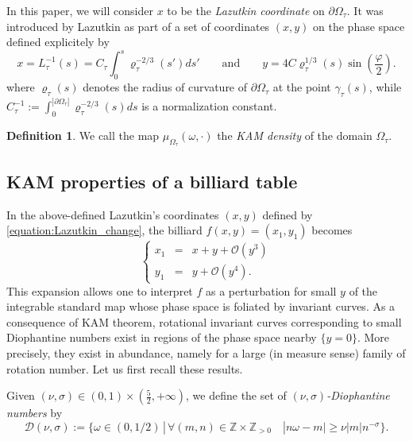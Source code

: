 \documentclass[12pt, openany]{amsart}
\theoremstyle{definition}
\newtheorem{definition}[theorem]{Definition}
\theoremstyle{remark}
\theoremstyle{remark}
\theoremstyle{theorem}
\theoremstyle{theorem}
\theoremstyle{theorem}
\theoremstyle{theorem}
\newcommand{\ZZ}{\mathbb{Z}}
\begin{document}
\medskip

In this paper, we will consider $x$ to be the {\it Lazutkin coordinate} on $\partial\Omega_{\tau}$. It was introduced by Lazutkin \cite{Lazutkin} as part of a set of coordinates $(x,y)$ on the phase space defined explicitely by
\begin{equation}
\label{equation:Lazutkin_change}
x = L^{-1}_{\tau}(s) = C_{\tau}\int_0^s \varrho_{\tau}^{-2/3}(s')ds'
\qquad\text{and}\qquad 
y=4C\varrho_{\tau}^{1/3}(s)\sin\left(\frac{\varphi}{2}\right).
\end{equation}
where $\varrho_{\tau}(s)$ denotes  the radius of curvature of $\partial\Omega_{\tau}$ at the point $\gamma_\tau(s)$, while $C_{\tau}^{-1} := \int_0^{|\partial\Omega_{\tau}|} \varrho_{\tau}^{-2/3}(s)ds$ is a normalization constant.\\



\begin{definition}
\label{definition:KAM_density}
We call the map $\mu_{\Omega_\tau}(\omega,\cdot)$ the \textit{KAM density} of the domain $\Omega_\tau$. 
\end{definition}

\subsection{KAM properties of a billiard table}




In the above-defined Lazutkin's coordinates $(x,y)$ defined by \eqref{equation:Lazutkin_change},
the billiard  $f(x,y)=(x_1,y_1)$ becomes
\[
\left\{
\begin{array}{ccl}
x_1 & = & x+y+\mathscr O(y^3)\\
y_1 & = & y +\mathscr O(y^4).
\end{array}\right.
\]
This expansion allows one to interpret $f$ as a perturbation for small $y$ of the integrable standard map whose phase space is foliated by invariant curves. As a consequence of KAM theorem, rotational invariant curves corresponding to small Diophantine numbers exist in regions of the phase space nearby $\{y=0\}$. More precisely, they exist in abundance, namely for a large (in measure sense) family of rotation number.
Let us first recall these results.

Given $(\nu,\sigma)\in(0,1)\times(\frac{5}{2},+\infty)$, we define the set of \textit{$(\nu,\sigma)$-Diophantine numbers} by
\[
\mathcal D(\nu,\sigma) := \{ \omega\in (0,1/2) \,|\, \forall (m,n)\in\ZZ\times\ZZ_{>0}
\quad |n\omega-m|\geq \nu |m| n^{-\sigma}\}.
\]
\end{document}
